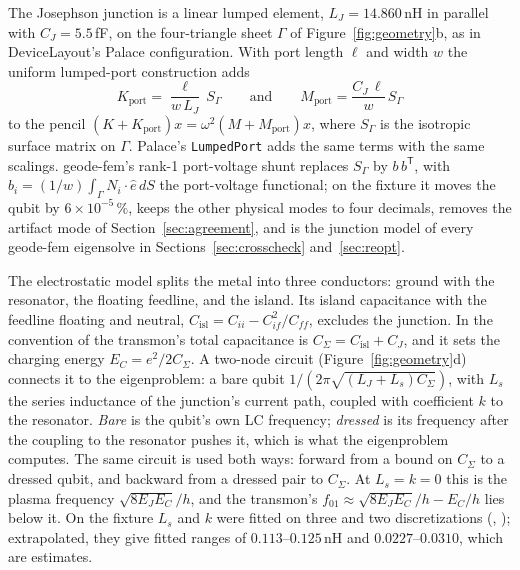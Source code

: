 \documentclass{anvil-paper}
\newcommand{\Cisl}{C_{\mathrm{isl}}}
\begin{document}
The Josephson junction is a linear lumped element, $L_J = 14.860$\,nH in
parallel with $C_J = 5.5$\,fF, on the four-triangle sheet $\Gamma$ of
Figure~\ref{fig:geometry}b, as in DeviceLayout's Palace configuration. With
port length $\ell$ and width $w$ the uniform lumped-port construction adds
\begin{equation}
  K_{\mathrm{port}} = \frac{\ell}{w\,L_J}\, S_\Gamma
  \qquad\text{and}\qquad
  M_{\mathrm{port}} = \frac{C_J\,\ell}{w}\, S_\Gamma
  \label{eq:port}
\end{equation}
to the pencil $(K + K_{\mathrm{port}})x = \omega^2(M + M_{\mathrm{port}})x$,
where $S_\Gamma$ is the isotropic surface matrix on $\Gamma$. Palace's
\texttt{LumpedPort} adds the same terms with the same scalings. geode-fem's
rank-1 port-voltage shunt replaces $S_\Gamma$ by $b\,b^{\mathsf T}$, with
$b_i = (1/w)\int_\Gamma N_i\cdot\hat e\,dS$ the port-voltage functional; on
the fixture it moves the qubit by $6\times10^{-5}\,\%$, keeps the other
physical modes to four decimals, removes the
artifact mode of Section~\ref{sec:agreement}, and is the junction model of
every geode-fem eigensolve in Sections~\ref{sec:crosscheck}
and~\ref{sec:reopt}.

The electrostatic model splits the metal into three conductors: ground
with the resonator, the floating feedline, and the island. Its island
capacitance with the feedline floating and neutral,
$\Cisl = C_{ii} - C_{if}^2/C_{ff}$, excludes the junction. In the
convention of \citet{koch2007charge} the transmon's total capacitance is
$C_\Sigma = \Cisl + C_J$, and it sets the charging energy $E_C =
e^2/2C_\Sigma$. A two-node circuit (Figure~\ref{fig:geometry}d) connects
it to the eigenproblem: a bare
qubit $1/(2\pi\sqrt{(L_J + L_s)C_\Sigma})$, with $L_s$ the series
inductance of the junction's current path, coupled with coefficient $k$
to the resonator. \emph{Bare} is the qubit's own LC frequency;
\emph{dressed} is its frequency after the coupling to the resonator
pushes it, which is what the eigenproblem computes. The same circuit is
used both ways: forward from a
bound on $C_\Sigma$ to a dressed qubit, and backward from a dressed pair to
$C_\Sigma$. At $L_s = k = 0$ this is the plasma frequency
$\sqrt{8E_JE_C}/h$, and the transmon's $f_{01} \approx \sqrt{8E_JE_C}/h -
E_C/h$ lies below it. On the fixture $L_s$ and $k$ were fitted on three and
two discretizations (,
); extrapolated, they give fitted ranges of $0.113$--$0.125$\,nH
and $0.0227$--$0.0310$, which are estimates.
\end{document}
